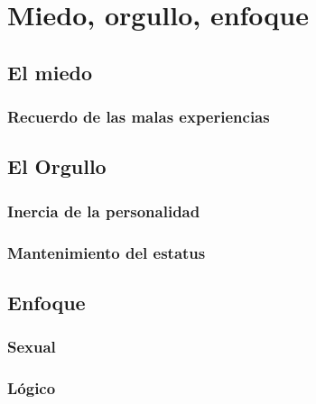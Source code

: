 \chapter*{Miedo, orgullo, enfoque}
\section*{El miedo}

\subsection*{Recuerdo de las malas experiencias}

\section*{El Orgullo}
\subsection*{Inercia de la personalidad}

\subsection*{Mantenimiento del estatus}

\section*{Enfoque}

\subsection*{Sexual}

\subsection*{Lógico}